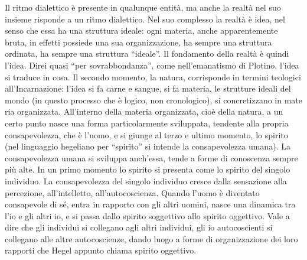 \documentclass[a4paper,12pt,oneside,openany]{book}%
\begin{document}
Il ritmo dialettico è presente in qualunque entità, ma anche la realtà nel suo insieme risponde a un ritmo dialettico. Nel suo complesso la realtà è idea, nel senso che essa ha una struttura ideale: ogni materia, anche apparentemente bruta, in effetti possiede una sua organizzazione, ha sempre una struttura ordinata, ha sempre una struttura “ideale”. Il fondamento della realtà è quindi l’idea. Direi quasi “per sovrabbondanza”, come nell’emanatismo di Plotino, l’idea si traduce in cosa. Il secondo momento, la natura, corrisponde in termini teologici all’Incarnazione: l’idea si fa carne e sangue, si fa materia, le strutture ideali del mondo (in questo processo che è logico, non cronologico), si concretizzano in mate ria organizzata. All’interno della materia organizzata, cioè della natura, a un certo punto nasce una forma particolarmente sviluppata, tendente alla propria consapevolezza, che è l’uomo, e si giunge al terzo e ultimo momento, lo spirito (nel linguaggio hegeliano per “spirito” si intende la consapevolezza umana). La consapevolezza umana si sviluppa anch’essa, tende a forme di conoscenza sempre più alte. In un primo momento lo spirito si presenta come lo spirito del singolo individuo. La consapevolezza del singolo individuo cresce dalla sensazione alla percezione, all’intelletto, all’autocoscienza. Quando l’uomo è diventato consapevole di sé, entra in rapporto con gli altri uomini, nasce una dinamica tra l’io e gli altri io, e si passa dallo spirito soggettivo allo spirito oggettivo. Vale a dire che gli individui si collegano agli altri individui, gli io autocoscienti si collegano alle altre autocoscienze, dando luogo a forme di organizzazione dei loro rapporti che Hegel appunto chiama spirito oggettivo.
\end{document}
